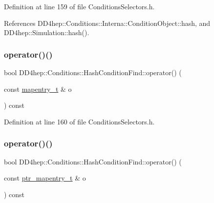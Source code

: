 Definition at line 159 of file Conditions\+Selectors.\+h.



References D\+D4hep\+::\+Conditions\+::\+Interna\+::\+Condition\+Object\+::hash, and D\+D4hep\+::\+Simulation\+::hash().

\hypertarget{class_d_d4hep_1_1_conditions_1_1_hash_condition_find_a4763328de3dede77bec28bf0ae53e154}{}\label{class_d_d4hep_1_1_conditions_1_1_hash_condition_find_a4763328de3dede77bec28bf0ae53e154} 
\subsubsection{\texorpdfstring{operator()()}{operator()()}\hspace{0.1cm}{\footnotesize\ttfamily [3/4]}}
{\footnotesize\ttfamily bool D\+D4hep\+::\+Conditions\+::\+Hash\+Condition\+Find\+::operator() (\begin{DoxyParamCaption}\item[{const \hyperlink{class_d_d4hep_1_1_conditions_1_1_cond_____oper_a877dac3da66795207aed15be219acbdc}{mapentry\+\_\+t} \&}]{o }\end{DoxyParamCaption}) const\hspace{0.3cm}{\ttfamily [inline]}}



Definition at line 160 of file Conditions\+Selectors.\+h.

\hypertarget{class_d_d4hep_1_1_conditions_1_1_hash_condition_find_a78827e11173392b09db7a32fe13ef951}{}\label{class_d_d4hep_1_1_conditions_1_1_hash_condition_find_a78827e11173392b09db7a32fe13ef951} 
\subsubsection{\texorpdfstring{operator()()}{operator()()}\hspace{0.1cm}{\footnotesize\ttfamily [4/4]}}
{\footnotesize\ttfamily bool D\+D4hep\+::\+Conditions\+::\+Hash\+Condition\+Find\+::operator() (\begin{DoxyParamCaption}\item[{const \hyperlink{class_d_d4hep_1_1_conditions_1_1_cond_____oper_a0949e4bd5f90cd3fae2394cf30983973}{ptr\+\_\+mapentry\+\_\+t} \&}]{o }\end{DoxyParamCaption}) const\hspace{0.3cm}{\ttfamily [inline]}}



